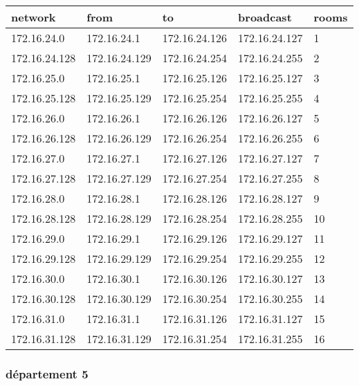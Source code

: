 \documentclass[11pt]{article}
\begin{document}
\begin{center}
\begin{tabular}{|l|l|l|l|l|}
\hline
network & from & to & broadcast & rooms \\
\hline
172.16.24.0 & 172.16.24.1 & 172.16.24.126 & 172.16.24.127 & 1 \\
\hline
172.16.24.128 & 172.16.24.129 & 172.16.24.254 & 172.16.24.255 & 2 \\
\hline
172.16.25.0 & 172.16.25.1 & 172.16.25.126 & 172.16.25.127 & 3 \\
\hline
172.16.25.128 & 172.16.25.129 & 172.16.25.254 & 172.16.25.255 & 4 \\
\hline
172.16.26.0 & 172.16.26.1 & 172.16.26.126 & 172.16.26.127 & 5 \\
\hline
172.16.26.128 & 172.16.26.129 & 172.16.26.254 & 172.16.26.255 & 6 \\
\hline
172.16.27.0 & 172.16.27.1 & 172.16.27.126 & 172.16.27.127 & 7 \\
\hline
172.16.27.128 & 172.16.27.129 & 172.16.27.254 & 172.16.27.255 & 8 \\
\hline
172.16.28.0 & 172.16.28.1 & 172.16.28.126 & 172.16.28.127 & 9 \\
\hline
172.16.28.128 & 172.16.28.129 & 172.16.28.254 & 172.16.28.255 & 10 \\
\hline
172.16.29.0 & 172.16.29.1 & 172.16.29.126 & 172.16.29.127 & 11 \\
\hline
172.16.29.128 & 172.16.29.129 & 172.16.29.254 & 172.16.29.255 & 12 \\
\hline
172.16.30.0 & 172.16.30.1 & 172.16.30.126 & 172.16.30.127 & 13 \\
\hline
172.16.30.128 & 172.16.30.129 & 172.16.30.254 & 172.16.30.255 & 14 \\
\hline
172.16.31.0 & 172.16.31.1 & 172.16.31.126 & 172.16.31.127 & 15 \\
\hline
172.16.31.128 & 172.16.31.129 & 172.16.31.254 & 172.16.31.255 & 16 \\
\hline
\end{tabular}
\end{center}

\subsubsection{département 5}
\label{sec:orgheadline9}
\end{document}
